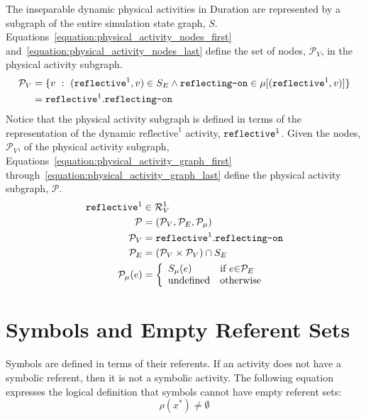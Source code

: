 The inseparable dynamic physical activities in Duration are
represented by a subgraph of the entire simulation state graph, $S$.
{\mbox{Equations~\ref{equation:physical_activity_nodes_first}}}
{\mbox{and~\ref{equation:physical_activity_nodes_last}}} define the
set of nodes, $\mathcal{P}_V$, in the physical activity subgraph.
\begin{align}
\label{equation:physical_activity_nodes_first}
  \mathcal{P}_V &= \{v ~:~ (\text{\tt{reflective}}^1, v) \in S_E \wedge \text{\tt{reflecting-on}} \in \mu[(\text{\tt{reflective}}^1, v)]\} \\
\label{equation:physical_activity_nodes_last}
                &= \text{\tt{reflective}}^1.\text{\tt{reflecting-on}}
\end{align}
Notice that the physical activity subgraph is defined in terms of the
representation of the dynamic $\text{reflective}^1$ activity,
$\text{\tt{reflective}}^1$.  Given the nodes, $\mathcal{P}_V$, of the
physical activity subgraph,
{\mbox{Equations~\ref{equation:physical_activity_graph_first}}}
{\mbox{through~\ref{equation:physical_activity_graph_last}}} define
the physical activity subgraph, $\mathcal{P}$.
\begin{align}
\label{equation:physical_activity_graph_first}
           \text{\tt{reflective}}^1 &\in \mathcal{R}^1_V \\
                        \mathcal{P} &= (\mathcal{P}_V, \mathcal{P}_E, \mathcal{P}_\mu) \\
                      \mathcal{P}_V &= \text{\tt{reflective}}^1.\text{\tt{reflecting-on}} \\
                      \mathcal{P}_E &= (\mathcal{P}_V \times \mathcal{P}_V) \cap S_E \\
\label{equation:physical_activity_graph_last}
\mathcal{P}_\mu(e) &=
   {\left\{
      \begin{array}{ll}
        S_\mu(e) & \text{if }e {\in} \mathcal{P}_E \\
        \text{undefined}          & \text{otherwise}
      \end{array}
    \right.}
\end{align}

\section{Symbols and Empty Referent Sets}

Symbols are defined in terms of their referents.  If an activity does
not have a symbolic referent, then it is not a symbolic activity.  The
following equation expresses the logical definition that symbols
cannot have empty referent sets:
\begin{equation*}
\rho(x^*) \neq \emptyset
\end{equation*}

